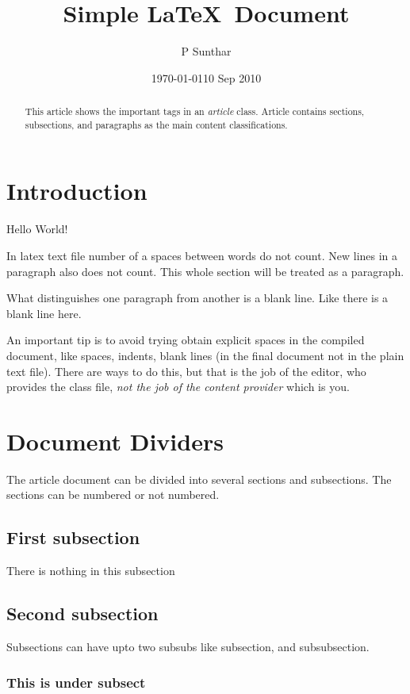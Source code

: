 \documentclass{article}
\begin{document}
\title{Simple \LaTeX\ Document}
\author{P Sunthar}

\date{\today} %
\date{10 Sep 2010}

\maketitle

\begin{abstract}
 This article shows the important tags in an \emph{article} class. Article contains
 sections, subsections, and paragraphs as the main content classifications.
\end{abstract}



\section{Introduction}

Hello World!

In latex text file number of a              spaces between words do not count.
New
lines
in 
a 
paragraph
also
does
not
count. This whole section will be treated as a paragraph.

What distinguishes one paragraph from another is a blank line. Like there
is a blank line here.

An important tip is to avoid trying obtain explicit spaces in the compiled
document, like spaces, indents, blank lines (in the final document not
in the plain text file). There are ways to do this, but that is the job
of the editor, who provides the class file,  \emph{not the job of the
content provider} which is you.


\section{Document Dividers}
 The article document can be divided into several sections and subsections.
 The sections can be numbered or not numbered.
 \subsection{First subsection}
  There is nothing in this subsection
 \subsection{Second subsection}
  Subsections can have upto two subsubs like subsection, and subsubsection.
  \subsubsection{This is  under subsect}
\end{document}
